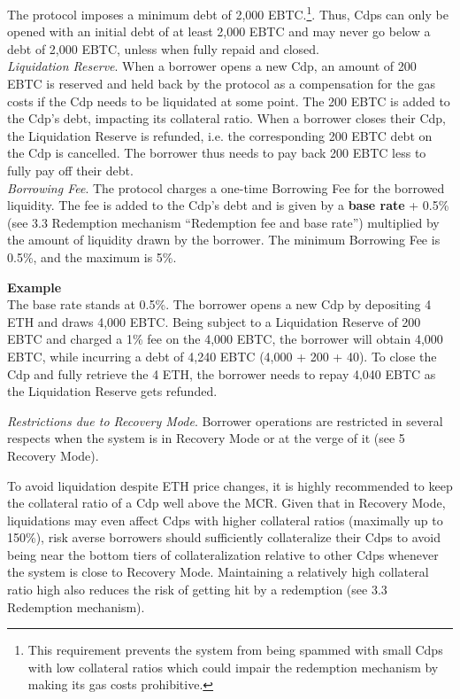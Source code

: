 \documentclass{article}
\begin{document}
The protocol imposes a minimum debt of 2,000 EBTC.\footnote{This requirement prevents the system from being spammed with small Cdps with low collateral ratios which could impair the redemption mechanism by making its gas costs prohibitive.}. Thus, Cdps can only be opened with an initial debt of at least 2,000 EBTC and may never go below a debt of 2,000 EBTC, unless when fully repaid and closed.
\\


\textit{Liquidation Reserve}. When a borrower opens a new Cdp, an amount of 200 EBTC is reserved and held back by the protocol as a compensation for the gas costs if the Cdp needs to be liquidated at some point. The 200 EBTC is added to the Cdp's debt, impacting its collateral ratio. When a borrower closes their Cdp, the Liquidation Reserve is refunded, i.e. the corresponding 200 EBTC debt on the Cdp is cancelled. The borrower thus needs to pay back 200 EBTC less to fully pay off their debt. \\

\textit{Borrowing Fee}.   The protocol charges a one-time Borrowing Fee for the borrowed liquidity. The fee is added to the Cdp's debt and is given by a \textbf{base rate} + 0.5\% (see 3.3 Redemption mechanism “Redemption fee and base rate”) multiplied by the amount of liquidity drawn by the borrower. The minimum Borrowing Fee is 0.5\%, and the maximum is 5\%. \\

\begin{tcolorbox}
\textbf{Example}\\
The base rate stands at 0.5\%. The borrower opens a new Cdp by depositing 4 ETH and draws 4,000 EBTC. Being subject to a Liquidation Reserve of 200 EBTC and charged a 1\% fee on the 4,000 EBTC, the borrower will obtain 4,000 EBTC, while incurring a debt of 4,240 EBTC (4,000 + 200 + 40). To close the Cdp and fully retrieve the 4 ETH, the borrower needs to repay 4,040 EBTC as the Liquidation Reserve gets refunded.
\end{tcolorbox}

\textit{Restrictions due to Recovery Mode}.   Borrower operations are restricted in several respects when the system is in Recovery Mode or at the verge of it (see 5 Recovery Mode). 

To avoid liquidation despite ETH price changes, it is highly recommended to keep the collateral ratio of a Cdp well above the MCR. Given that in Recovery Mode, liquidations may even affect Cdps with higher collateral ratios (maximally up to 150\%), risk averse borrowers should sufficiently collateralize their Cdps to avoid being near the bottom tiers of collateralization relative to other Cdps whenever the system is close to Recovery Mode. Maintaining a relatively high collateral ratio high also reduces the risk of getting hit by a redemption (see 3.3 Redemption mechanism).
\end{document}

